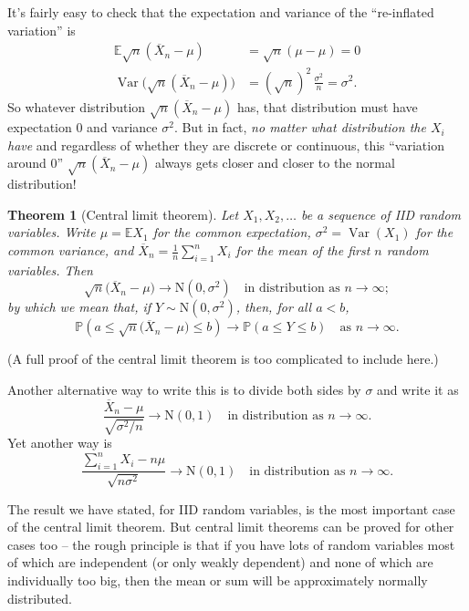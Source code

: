 \documentclass[
  a4paper,
]{book}
\newtheorem{theorem}{Theorem}[chapter]
\theoremstyle{definition}
\theoremstyle{definition}
\theoremstyle{definition}
\theoremstyle{definition}
\theoremstyle{remark}
\begin{document}
It's fairly easy to check that the expectation and variance of the ``re-inflated variation'' is
\begin{align*}
\mathbb E\sqrt{n} (\overline X_n - \mu) &= \sqrt{n}(\mu - \mu) = 0 \\
\operatorname{Var}\big(\sqrt{n} (\overline X_n - \mu)\big) &= (\sqrt n)^2 \, \frac{\sigma^2}{n} = \sigma^2 . 
\end{align*}
So whatever distribution \(\sqrt{n}(\overline X_n - \mu)\) has, that distribution must have expectation \(0\) and variance \(\sigma^2\). But in fact, \emph{no matter what distribution the \(X_i\) have} and regardless of whether they are discrete or continuous, this ``variation around 0'' \(\sqrt{n}(\overline X_n - \mu)\) always gets closer and closer to the normal distribution!

\begin{theorem}[Central limit theorem]
\protect\hypertarget{thm:thCLT}{}\label{thm:thCLT}Let \(X_1, X_2, \dots\) be a sequence of IID random variables. Write \(\mu = \mathbb EX_1\) for the common expectation, \(\sigma^2 = \operatorname{Var}(X_1)\) for the common variance, and \(\overline X_n =\frac{1}{n} \sum_{i=1}^n X_i\) for the mean of the first \(n\) random variables. Then
\[ \sqrt{n}\big(\overline X_n - \mu\big) \to \mathrm N(0, \sigma^2) \quad \text{in distribution as $n \to \infty$}; \]
by which we mean that, if \(Y \sim \mathrm N(0, \sigma^2)\), then, for all \(a < b\),
\[ \mathbb P\left(a \leq \sqrt{n}\big(\overline X_n - \mu\big) \leq b \right) \to \mathbb P(a \leq Y \leq b) \quad \text{as $n\to\infty$.} \]
\end{theorem}

(A full proof of the central limit theorem is too complicated to include here.)

Another alternative way to write this is to divide both sides by \(\sigma\) and write it as
\[ \frac{\overline X_n - \mu}{\sqrt{\sigma^2/n}} \to \mathrm N(0, 1) \quad \text{in distribution as $n \to \infty$}. \]
Yet another way is
\[ \frac{\sum_{i=1}^n X_i - n\mu}{\sqrt{n\sigma^2}} \to \mathrm N(0, 1) \quad \text{in distribution as $n \to \infty$}. \]

The result we have stated, for IID random variables, is the most important case of the central limit theorem. But central limit theorems can be proved for other cases too -- the rough principle is that if you have lots of random variables most of which are independent (or only weakly dependent) and none of which are individually too big, then the mean or sum will be approximately normally distributed.
\end{document}
